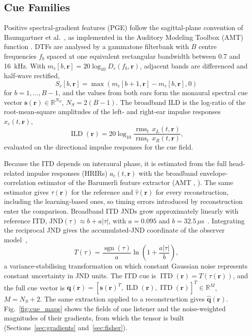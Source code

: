 \documentclass[journal]{IEEEtran}
\begin{document}
\subsection{Cue Families}
Positive spectral-gradient features (PGE) follow the sagittal-plane convention of Baumgartner et al.~\cite{Baumgartner2014}, as implemented in the Auditory Modeling Toolbox (AMT) function . DTFs are analysed by a gammatone filterbank with \(B\) centre frequencies \(f_b\) spaced at one equivalent rectangular bandwidth between 0.7 and 16~kHz. With \(m_c[b,\mathbf r]=20\log_{10}D_c(f_b,\mathbf r)\), adjacent bands are differenced and half-wave rectified,
\begin{equation}
S_c[b,\mathbf{r}]
=\max\!\left(m_c[b+1,\mathbf{r}]-m_c[b,\mathbf{r}],0\right)
\end{equation}
for \(b=1,\ldots,B-1\), and the values from both ears form the monaural spectral cue vector \(\mathbf s(\mathbf r)\in\mathbb R^{N_S}\), \(N_S=2(B-1)\). The broadband ILD is the log-ratio of the root-mean-square amplitudes of the left- and right-ear impulse responses \(x_c(t,\mathbf r)\),
\begin{equation}
\operatorname{ILD}(\mathbf{r})
= 20\log_{10}
\frac{\operatorname{rms}_t\, x_L(t,\mathbf{r})}
     {\operatorname{rms}_t\, x_R(t,\mathbf{r})},
\label{eq:ild}
\end{equation}
evaluated on the directional impulse responses for the cue field.

Because the ITD depends on interaural phase, it is estimated from the full head-related impulse responses (HRIRs) \(a_c(t,\mathbf r)\) with the broadband envelope-correlation estimator of the Barumerli feature extractor (AMT , ). The same estimator gives \(\tau(\mathbf r)\) for the reference and \(\hat\tau(\mathbf r)\) for every reconstruction, including the learning-based ones, so timing errors introduced by reconstruction enter the comparison. Broadband ITD JNDs grow approximately linearly with reference ITD, \(\mathrm{JND}(\tau)\approx b+a|\tau|\), with \(a=0.095\) and \(b=32.5\,\mu\mathrm{s}\)~\cite{Reijniers2014}. Integrating the reciprocal JND gives the accumulated-JND coordinate of the observer model~\cite{Reijniers2014,Barumerli2023},
\begin{equation}
T(\tau)=\frac{\operatorname{sgn}(\tau)}{a}
\ln\!\left(1+\frac{a|\tau|}{b}\right),
\end{equation}
a variance-stabilising transformation on which constant Gaussian noise represents constant uncertainty in JND units. The ITD cue is \(\operatorname{ITD}(\mathbf{r}) = T(\tau(\mathbf{r}))\), and the full cue vector is \(\mathbf q(\mathbf r)=[\mathbf s(\mathbf r)^T,\operatorname{ILD}(\mathbf r),\operatorname{ITD}(\mathbf r)]^T\in\mathbb R^M\), \(M=N_S+2\). The same extraction applied to a reconstruction gives \(\widehat{\mathbf q}(\mathbf r)\). Fig.~\ref{fig:cue_maps} shows the fields of one listener and the noise-weighted magnitudes of their gradients, from which the tensor is built (Sections~\ref{sec:gradients} and~\ref{sec:fisher}).
\end{document}
